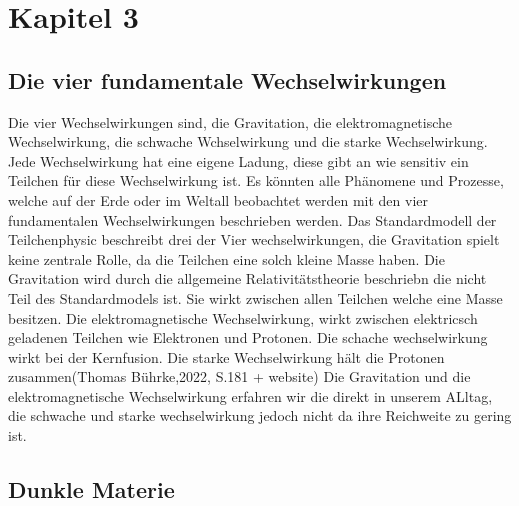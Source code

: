 
\section{Kapitel 3}


\subsection{Die vier fundamentale Wechselwirkungen}

Die vier Wechselwirkungen sind, die Gravitation, die elektromagnetische Wechselwirkung, die schwache Wchselwirkung und die 
starke Wechselwirkung. Jede Wechselwirkung hat eine eigene Ladung, diese gibt an wie sensitiv ein Teilchen für diese Wechselwirkung ist. 
Es könnten alle Phänomene und Prozesse, welche auf der Erde oder im Weltall beobachtet werden mit den vier fundamentalen Wechselwirkungen beschrieben werden.
Das Standardmodell der Teilchenphysic beschreibt drei der Vier wechselwirkungen, die Gravitation spielt keine zentrale Rolle, da die Teilchen eine solch kleine Masse haben.
Die Gravitation wird durch die allgemeine Relativitätstheorie beschriebn die nicht Teil des Standardmodels ist. Sie wirkt zwischen allen Teilchen welche eine Masse besitzen. Die elektromagnetische
Wechselwirkung, wirkt zwischen elektricsch geladenen Teilchen wie Elektronen und Protonen. Die schache wechselwirkung wirkt bei der Kernfusion. Die starke Wechselwirkung hält die Protonen zusammen(Thomas Bührke,2022, S.181 + website)
Die Gravitation und die elektromagnetische Wechselwirkung erfahren wir die direkt in unserem ALltag, die schwache und starke wechselwirkung jedoch nicht da ihre Reichweite zu gering ist.

\subsection{Dunkle Materie}

